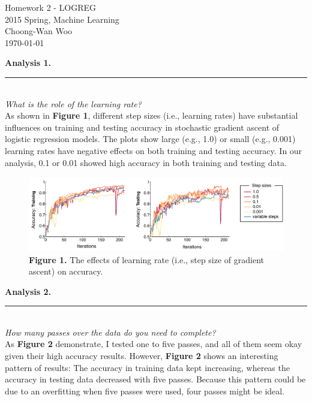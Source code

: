 \documentclass[letterpaper,11pt,notitlepage]{article}
\begin{document}
\begin{center}
	Homework 2 - LOGREG\\
	2015 Spring, Machine Learning\\
	Choong-Wan Woo\\
	\today\\
\end{center}

\hspace*{-1cm}\textbf{Analysis 1.}  \rule{10.5cm}{0.4pt}\\
\noindent\textit{What is the role of the learning rate?}\\

\noindent As shown in \textbf{Figure 1}, different step sizes (i.e., learning rates) have substantial influences on training and testing accuracy in stochastic gradient ascent of logistic regression models. The plots show large (e.g., 1.0) or small (e.g., 0.001) learning rates have negative effects on both training and testing accuracy. In our analysis, 0.1 or 0.01 showed high accuracy in both training and testing data. 

\begin{figure}[ht!]
	\centering
	\includegraphics[width=12.5cm]{figure1_axis}
	\captionsetup{width=.8\textwidth}
	\caption{\textbf{Figure 1.} The effects of learning rate (i.e., step size of gradient ascent) on accuracy.} 
\end{figure}

\hspace*{-1cm}\textbf{Analysis 2.}  \rule{10.5cm}{0.4pt}\\
\noindent\textit{How many passes over the data do you need to complete?}\\

\noindent As \textbf{Figure 2} demonstrate, I tested one to five passes, and all of them seem okay given their high accuracy results. However, \textbf{Figure 2} shows an interesting pattern of results: The accuracy in training data kept increasing, whereas the accuracy in testing data decreased with five passes. Because this pattern could be due to an overfitting when five passes were used, four passes might be ideal.\\\\
\end{document}
